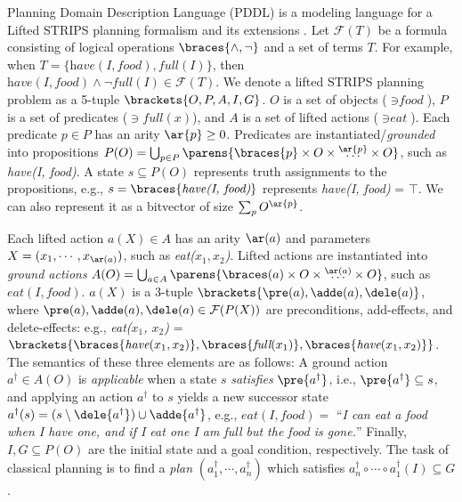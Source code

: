 Planning Domain Description Language (PDDL) is a modeling language for
a Lifted STRIPS planning formalism \citep{FikesHN72} and its extensions \citep{pddlbook}.
Let $\mathcal{F}(T)$ be a formula consisting of
 logical operations $\braces{\land,\lnot}$
and a set of terms $T$.
For example, when $T=\{\textit{have}(\textit{I}, \textit{food}), \textit{full}(\textit{I})\}$,
 then $\textit{have}(\textit{I}, \textit{food})\land\lnot\textit{full}(\textit{I})\in \mathcal{F}(T)$.
We denote a lifted STRIPS planning problem
as a 5-tuple $\brackets{O,P,A,I,G}$.
 $O$ is a set of objects ($\ni\textit{food}$),
 $P$ is a set of predicates ($\ni\textit{full}(x)$), and
 $A$ is a set of lifted actions ($\ni\textit{eat}$).
Each predicate $p\in P$ has an arity $\ar{p}\geq 0$.
Predicates are instantiated/\emph{grounded} into
propositions $P(O)=\bigcup_{p\in P} \parens{\braces{p}\times O\times\overset{\ar{p}}{\ldots}\times O}$,
such as \textit{have(I, food)}.
A state $s\subseteq P(O)$ represents truth assignments to the propositions,
e.g., $s=\braces{\textit{have(I, food)}}$ represents \textit{have(I, food)} = $\top$. %
We can also represent it as a bitvector of size $\sum_p O^{\ar{p}}$.

Each lifted action $a(X)\in A$ has an arity $\ar(a)$
and parameters $X=(x_1,\cdots,x_{\ar(a)})$, such as \textit{eat($x_1, x_2$)}.
Lifted actions are instantiated into 
\emph{ground actions} $A(O)=\bigcup_{a\in A} \parens{\braces(a)\times O\times\overset{\ar(a)}{\ldots}\times O}$,
such as $\textit{eat}(\textit{I},\textit{food})$.
$a(X)$ is a 3-tuple $\brackets{\pre(a),\adde(a),\dele(a)}$, where
 $\pre(a), \adde(a), \dele(a) \in \mathcal{F}(P(X))$ are
 preconditions, add-effects, and delete-effects:
e.g., \textit{eat($x_1$, $x_2$)} = $\brackets{\braces{\textit{have}(x_1, x_2)}, \braces{\textit{full}(x_1)}, \braces{\textit{have}(x_1,x_2)}}$.
The semantics of these three elements are as follows:
A ground action $a^{\dagger}\in A(O)$ is \emph{applicable} when a state $s$ \emph{satisfies} $\pre{a^{\dagger}}$, i.e., $\pre{a^{\dagger}}\subseteq s$,
and applying an action $a^{\dagger}$ to $s$ yields a new successor state
$a^{\dagger}(s) = (s \setminus \dele{a^{\dagger}}) \cup \adde{a^{\dagger}}$,
e.g., $\textit{eat}(\textit{I},\textit{food})=$ ``\emph{I can eat a food when I have one, and if I eat one I am full but the food is gone.}''
Finally,
$I,G\subseteq P(O)$ are the initial state and a goal condition, respectively.
The task of classical planning is to find a \emph{plan} $(a^{\dagger}_1,\cdots,a^{\dagger}_n)$
which satisfies $a^{\dagger}_n \circ \cdots \circ a^{\dagger}_1(I) \subseteq G$.

